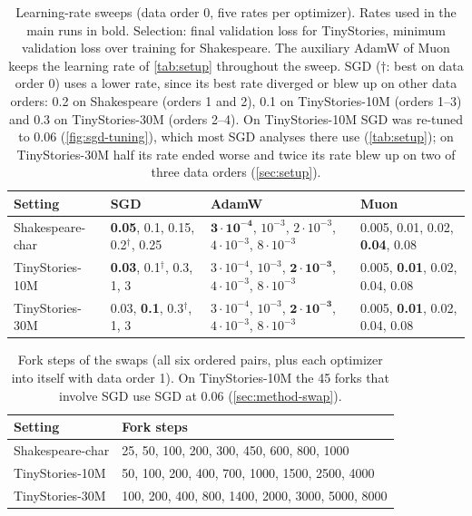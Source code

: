 \documentclass[10pt]{article}
\begin{document}
\begin{table}[ht]
\centering\small
\caption{Learning-rate sweeps (data order 0, five rates per optimizer). Rates used in the main runs in bold.
Selection: final validation loss for TinyStories, minimum validation loss over training for Shakespeare. The
auxiliary AdamW of Muon keeps the learning rate of \cref{tab:setup} throughout the sweep. SGD ($\dagger$: best
on data order 0) uses a lower rate, since its best rate diverged or blew up on other data orders: 0.2 on
Shakespeare (orders 1 and 2), 0.1 on TinyStories-10M (orders 1--3) and 0.3 on TinyStories-30M (orders 2--4).
On TinyStories-10M SGD was re-tuned to 0.06 (\cref{fig:sgd-tuning}), which most SGD analyses there use
(\cref{tab:setup}); on TinyStories-30M half its rate ended worse and twice its rate blew up on two of three data orders
(\cref{sec:setup}).}
\label{tab:sweep}
\begin{tabular}{@{}llll@{}}
\toprule
Setting & SGD & AdamW & Muon \\
\midrule
Shakespeare-char & \textbf{0.05}, 0.1, 0.15, 0.2$^\dagger$, 0.25 & $\mathbf{3\cdot10^{-4}}$, $10^{-3}$, $2\cdot10^{-3}$,
  $4\cdot10^{-3}$, $8\cdot10^{-3}$ & 0.005, 0.01, 0.02, \textbf{0.04}, 0.08 \\
TinyStories-10M & \textbf{0.03}, 0.1$^\dagger$, 0.3, 1, 3 & $3\cdot10^{-4}$, $10^{-3}$, $\mathbf{2\cdot10^{-3}}$,
  $4\cdot10^{-3}$, $8\cdot10^{-3}$ & 0.005, \textbf{0.01}, 0.02, 0.04, 0.08 \\
TinyStories-30M & 0.03, \textbf{0.1}, 0.3$^\dagger$, 1, 3 & $3\cdot10^{-4}$, $10^{-3}$, $\mathbf{2\cdot10^{-3}}$,
  $4\cdot10^{-3}$, $8\cdot10^{-3}$ & 0.005, \textbf{0.01}, 0.02, 0.04, 0.08 \\
\bottomrule
\end{tabular}
\end{table}

\begin{table}[ht]
\centering\small
\caption{Fork steps of the swaps (all six ordered pairs, plus each optimizer into itself with data order 1). On
TinyStories-10M the 45 forks that involve SGD use SGD at 0.06 (\cref{sec:method-swap}).}
\label{tab:forks}
\begin{tabular}{@{}ll@{}}
\toprule
Setting & Fork steps \\
\midrule
Shakespeare-char & 25, 50, 100, 200, 300, 450, 600, 800, 1000 \\
TinyStories-10M & 50, 100, 200, 400, 700, 1000, 1500, 2500, 4000 \\
TinyStories-30M & 100, 200, 400, 800, 1400, 2000, 3000, 5000, 8000 \\
\bottomrule
\end{tabular}
\end{table}
\end{document}
